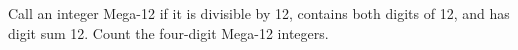 Call an integer Mega-12 if it is divisible by 12, contains both digits of 12, and has digit sum 12. Count the four-digit Mega-12 integers.
